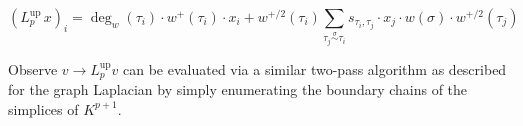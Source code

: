 \documentclass[pdflatex,sn-mathphys-num]{sn-jnl}
\begin{document}
\begin{appendices}
\[\left. \left( L_{p}^{\operatorname{up}}\, x \right) \right._{i} = \deg_{w}\left( \tau_{i} \right) \cdot w^{+}\left( \tau_{i} \right) \cdot x_{i} + w^{+ /2}\left( \tau_{i} \right)\sum_{\tau_{j}\overset{\sigma}{\sim}\tau_{i}}s_{\tau_{i},\tau_{j}} \cdot x_{j} \cdot w(\sigma) \cdot w^{+ /2}\left( \tau_{j} \right)\] \label{eq:l_up_matvec}{}

\noindent Observe \(v \rightarrow L_{p}^{\operatorname{up}}v\) can be evaluated via a similar two-pass algorithm as described for the graph Laplacian by simply enumerating the boundary chains of the simplices of \(K^{p + 1}\).

%

\end{appendices}
\end{document}
